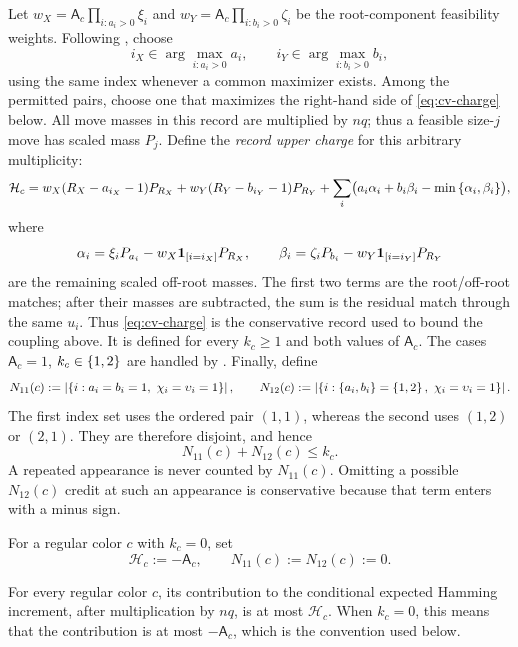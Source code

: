 \begin{definition}
Let
$w_X=\mathsf A_c\prod_{i:a_i>0}\xi_i$ and
$w_Y=\mathsf A_c\prod_{i:b_i>0}\zeta_i$ be the root-component
feasibility weights.  Following , choose
\[
 i_X\in\arg\max_{i:a_i>0}a_i,
 \qquad
 i_Y\in\arg\max_{i:b_i>0}b_i,
\]
using the same index whenever a common maximizer exists.  Among the
permitted pairs, choose one that maximizes the right-hand side of
\eqref{eq:cv-charge} below.  All move masses in this record are multiplied
by \(nq\); thus a feasible size-\(j\) move has scaled mass \(P_j\).
Define the \emph{record upper charge} for this arbitrary multiplicity:
\begin{equation}\label{eq:cv-charge}
  \mathcal H_c=
    w_X(R_X-a_{i_X}-1)P_{R_X}
    +w_Y(R_Y-b_{i_Y}-1)P_{R_Y}
   +\sum_i\bigl(a_i\alpha_i+b_i\beta_i-\min\left\{\alpha_i,\beta_i\right\}\bigr),
\end{equation}
where
\[
 \alpha_i=\xi_iP_{a_i}-w_X\mathbf{1}_{\left[i=i_X\right]}P_{R_X},\qquad
 \beta_i=\zeta_iP_{b_i}-w_Y\mathbf{1}_{\left[i=i_Y\right]}P_{R_Y}
\]
are the remaining scaled off-root masses.  The first
two terms are the root/off-root matches; after
their masses are subtracted, the sum is the residual match through the
same $u_i$.  Thus \eqref{eq:cv-charge} is the conservative record used to
bound the coupling above.  It is defined for every
$k_c\ge1$ and both values of $\mathsf A_c$.  The cases
$\mathsf A_c=1$, $k_c\in\left\{1,2\right\}$ are handled by
.  Finally, define
\[
  N_{11}(c):=\abs{\set{i:a_i=b_i=1,\ \chi_i=\upsilon_i=1}},
  \qquad
  N_{12}(c):=\abs{\set{i:\set{a_i,b_i}=\set{1,2},\
                              \chi_i=\upsilon_i=1}} .
\]
The first index set uses the ordered pair $(1,1)$, whereas the second uses
$(1,2)$ or $(2,1)$.  They are therefore disjoint, and hence
\begin{equation}\label{eq:cv-small-count-budget}
  N_{11}(c)+N_{12}(c)\le k_c.
\end{equation}
A repeated appearance is never counted by $N_{11}(c)$.  Omitting a
possible $N_{12}(c)$ credit at such an appearance is conservative because
that term enters with a minus sign.
\end{definition}

For a regular color \(c\) with \(k_c=0\), set
\[
  \mathcal H_c:=-\mathsf A_c,
  \qquad N_{11}(c):=N_{12}(c):=0.
\]

\begin{lemma}\label{lem:cv-record-domination}
For every regular color \(c\), its contribution to the conditional
expected Hamming increment, after multiplication by \(nq\), is at most
\(\mathcal H_c\).  When \(k_c=0\), this means that the contribution is at
most \(-\mathsf A_c\), which is the convention used below.
\end{lemma}

